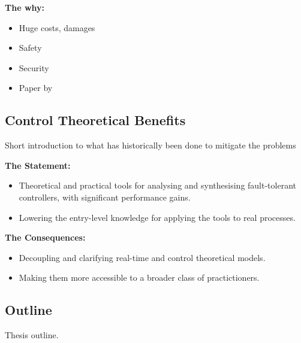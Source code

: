{\textbf{The why:}
\begin{itemize}
    \item Huge costs, damages
    \item Safety
    \item Security
    \item Paper by~\cite{Akesson:2020}
\end{itemize}

\subsection*{Control Theoretical Benefits}%
%
Short introduction to what has historically been done to mitigate the problems

\textbf{The Statement:}
\begin{itemize}
    \item Theoretical and practical tools for analysing and synthesising
        fault-tolerant controllers, with significant performance gains.
    \item Lowering the entry-level knowledge for applying the tools to real
        processes.
\end{itemize}

\textbf{The Consequences:}
\begin{itemize}
    \item Decoupling and clarifying real-time and control theoretical models.
    \item Making them more accessible to a broader class of practictioners.
\end{itemize}

\subsection*{Outline}%
%
Thesis outline.
}%
